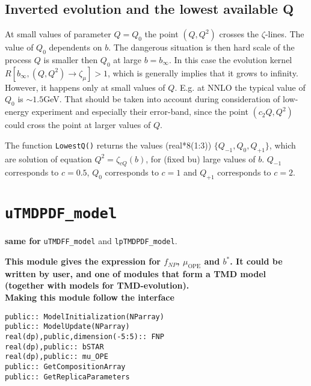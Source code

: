 \documentclass[prd,nofootinbib,eqsecnum,final]{revtex4}
\renewcommand{\(}{\left(}
\renewcommand{\)}{\right)}
\renewcommand{\[}{\left[}
\renewcommand{\]}{\right]}
\newcommand{\blue}[1]{{\color{blue} #1}}
\begin{document}
\subsection{Inverted evolution and the lowest available Q}
\label{TMDR:Q}

At small values of parameter $Q=Q_0$ the point $(Q,Q^2)$ crosses the $\zeta$-lines. The value of $Q_0$ dependents on $b$. The dangerous situation is then hard scale of the process $Q$ is smaller then $Q_0$ at large $b=b_\infty$. In this case the evolution kernel $R[b_\infty,(Q,Q^2)\to \zeta_\mu]>1$, which is generally implies that it grows to infinity. However, it happens only at small values of $Q$. E.g. at NNLO the typical value of $Q_0$ is $\sim 1.5$GeV. That should be taken into account during consideration of low-energy experiment and especially their error-band, since the point $(c_2Q,Q^2)$ could cross the point at larger values of $Q$.

The function \texttt{LowestQ()} returns the values (real*8(1:3)) $\{Q_{-1},Q_0,Q_{+1}\}$, which are solution of equation $Q^2=\zeta_{c Q}(b)$, for (fixed bu) large values of $b$. $Q_{-1}$ corresponds to $c=0.5$, $Q_0$ corresponds to $c=1$ and $Q_{+1}$ corresponds to $c=2$.

\newpage
\section{\texttt{uTMDPDF\_model}}
\begin{center}
\blue{\textbf{same for}} \texttt{uTMDFF\_model} and \texttt{lpTMDPDF\_model}.
\end{center}

\begin{tcolorbox}
\begin{center}
\textbf{This module gives the expression for $f_{NP}$, $\mu_{\text{OPE}}$ and $b^*$. It could be written by user, and one of modules that form a TMD model (together with models for TMD-evolution).}
\\
\textbf{\blue{Making this module follow the interface}}
\end{center}
\texttt{public:: ModelInitialization(NParray)}
\\
\texttt{public:: ModelUpdate(NParray)}
\\
\texttt{real(dp),public,dimension(-5:5):: FNP}
\\
\texttt{real(dp),public:: bSTAR}
\\
\texttt{real(dp),public:: mu\_OPE}
\\
\texttt{public:: GetCompositionArray}
\\
\texttt{public:: GetReplicaParameters}
\end{tcolorbox}
\end{document}
